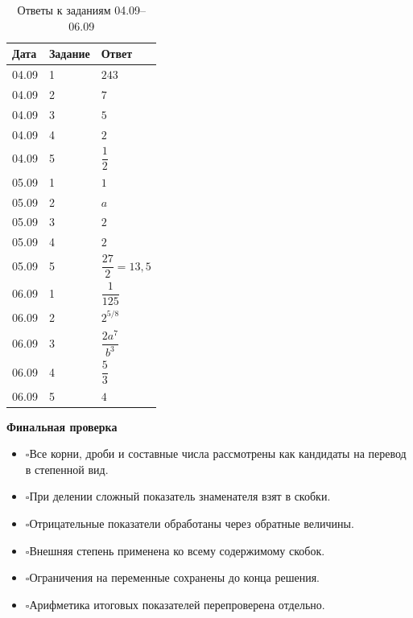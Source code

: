\documentclass[a4paper,12pt]{article}
\newcommand{\checkitem}{\(\square\)\;}
\begin{document}
\begin{table}[htbp]
\centering
\caption{Ответы к заданиям 04.09--06.09}
\begin{tabularx}{\linewidth}{@{}p{0.19\linewidth}p{0.18\linewidth}X@{}}
\toprule
\textbf{Дата} & \textbf{Задание} & \textbf{Ответ} \\
\midrule

04.09 & 1 & \(243\) \\
04.09 & 2 & \(7\) \\
04.09 & 3 & \(5\) \\
04.09 & 4 & \(2\) \\
04.09 & 5 & \(\dfrac12\) \\

\midrule

05.09 & 1 & \(1\) \\
05.09 & 2 & \(a\) \\
05.09 & 3 & \(2\) \\
05.09 & 4 & \(2\) \\
05.09 & 5 & \(\dfrac{27}{2}=13{,}5\) \\

\midrule

06.09 & 1 & \(\dfrac1{125}\) \\
06.09 & 2 & \(2^{5/8}\) \\
06.09 & 3 & \(\dfrac{2a^7}{b^3}\) \\
06.09 & 4 & \(\dfrac53\) \\
06.09 & 5 & \(4\) \\

\bottomrule
\end{tabularx}
\end{table}

\vspace{8mm}

\begin{center}
\color{darkaccent}
\textbf{Финальная проверка}
\end{center}

\begin{itemize}
  \item \checkitem Все корни, дроби и составные числа рассмотрены как кандидаты на перевод в степенной вид.
  \item \checkitem При делении сложный показатель знаменателя взят в скобки.
  \item \checkitem Отрицательные показатели обработаны через обратные величины.
  \item \checkitem Внешняя степень применена ко всему содержимому скобок.
  \item \checkitem Ограничения на переменные сохранены до конца решения.
  \item \checkitem Арифметика итоговых показателей перепроверена отдельно.
\end{itemize}
\end{document}
